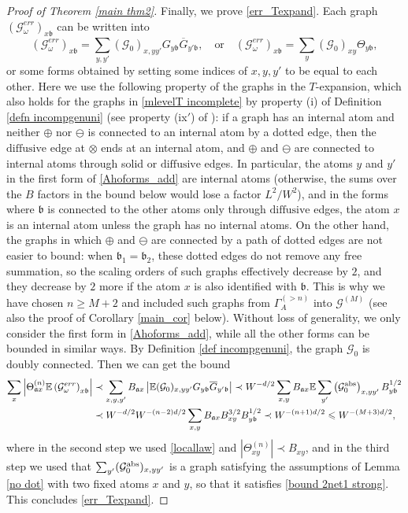 \documentclass{article}
\newcommand{\1}{\mathds{1}}
\numberwithin{equation}{section}
\newcommand{\be}{\begin{equation}}
\newcommand{\ee}{\end{equation}}
\newcommand{\fa}{{\mathfrak a}}
\newcommand{\fb}{{\mathfrak b}}
\renewcommand{\cal}{\mathcal}
\renewcommand{\leq}{\leqslant}
\renewcommand{\geq}{\geqslant}
\renewcommand{\le}{\leq}
\renewcommand{\ge}{\geq}
\newcommand{\E}{\mathbb{E}}
\newcommand{\dashed}{\text{diffusive}}
\newcommand{\abs}{{\rm abs}}%
\theoremstyle{plain} %
\theoremstyle{remark}
\begin{document}
\begin{proof}[Proof of Theorem \ref{main thm2}]
Finally, we prove \eqref{err_Texpand}. Each graph $\left(\cal G^{err}_\omega \right)_{x\fb}$ can be written into 
\be \label{Ahoforms_add}
\left(\cal G^{err}_\omega \right)_{x\fb} = \sum_{y, y'}(\cal G_0)_{x,yy'} G_{y\fb}\overline G_{y'\fb}, \quad \text{or}\quad  \left(\cal G^{err}_\omega \right)_{x\fb}= \sum_{y} (\cal G_0)_{xy}\Theta_{y\fb},\ee
or some forms obtained by setting some indices of $x,y,y'$ to be equal to each other. Here we use the following property of the graphs in the $T$-expansion, which also holds for the graphs in \eqref{mlevelT incomplete} by property (i) of Definition \ref{defn incompgenuni} (see property (ix$'$) of \cite[Definition 3.2]{PartII_high}): if a graph has an internal atom and neither $\oplus$ nor $\ominus$ is connected to an internal atom by a dotted edge, then the $\dashed$ edge at $\otimes$ ends at an internal atom, and $\oplus$ and $\ominus$ are connected to internal atoms through solid or $\dashed$ edges. In particular, the atoms $y$ and $y'$ in the first form of \eqref{Ahoforms_add} are internal atoms (otherwise, the sums over the $B$ factors in the bound below would lose a factor $L^2/W^2$), and in the forms where $\fb$ is connected to the other atoms only through $\dashed$ edges, the atom $x$ is an internal atom unless the graph has no internal atoms. On the other hand, the graphs in which $\oplus$ and $\ominus$ are connected by a path of dotted edges are not easier to bound: when $\fb_1=\fb_2$, these dotted edges do not remove any free summation, so the scaling orders of such graphs effectively decrease by $2$, and they decrease by $2$ more if the atom $x$ is also identified with $\fb$. This is why we have chosen $n\ge M+2$ and included such graphs from $\Gamma_A^{(>n)}$ into $\cal G^{(M)}$ (see also the proof of Corollary \ref{main_cor} below). Without loss of generality, we only consider the first form in \eqref{Ahoforms_add}, while all the other forms can be bounded in similar ways. By Definition \ref{def incompgenuni}, the graph $\cal G_0$ is doubly connected. Then we can get the bound
\begin{align*}
 \sum_{x}  \left|\Theta^{(n)}_{\fa x}  \E\left(\cal G^{err}_\omega \right)_{x\fb}\right| & \prec   \sum_{x,y, y'}B_{\fa x} \left|\E (\cal G_0)_{x,yy'} G_{y\fb}\overline G_{y'\fb}\right|\prec  W^{-d/2}\sum_{x,y}B_{\fa x}\E \sum_{y'}\left(\cal G_0^{\abs}\right)_{x,yy'}B^{1/2}_{y\fb}\\
	& \prec  W^{-d/2}W^{-(n-2)d/2}\sum_{x,y}B_{\fa x}B_{x y}^{3/2} B^{1/2}_{y\fb}\prec W^{-(n+1)d/2}\le W^{-(M+3)d/2},
\end{align*}
where in the second step we used \eqref{locallaw} and $|\Theta^{(n)}_{xy}|\prec B_{xy}$, and in the third step we used that $\sum_{y'} ({\cal G}_0^{\rm{abs}})_{x, y y'}$ is a graph satisfying the assumptions of Lemma \ref{no dot} with two fixed atoms $x$ and $ y$, so that it satisfies \eqref{bound 2net1 strong}. This concludes \eqref{err_Texpand}.
\end{proof}
\end{document}
